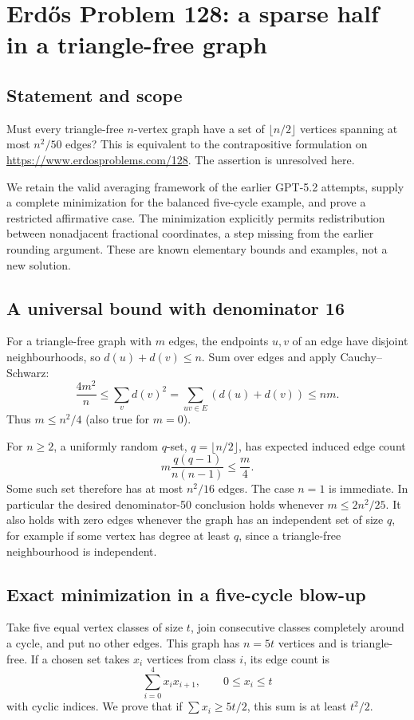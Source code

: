 \section*{Erd\H{o}s Problem 128: a sparse half in a triangle-free graph}
\subsection*{Statement and scope}
Must every triangle-free $n$-vertex graph have a set of $\lfloor n/2\rfloor$ vertices spanning at most $n^2/50$ edges? This is equivalent to the contrapositive formulation on \url{https://www.erdosproblems.com/128}. The assertion is unresolved here.

We retain the valid averaging framework of the earlier GPT-5.2 attempts, supply a complete minimization for the balanced five-cycle example, and prove a restricted affirmative case. The minimization explicitly permits redistribution between nonadjacent fractional coordinates, a step missing from the earlier rounding argument. These are known elementary bounds and examples, not a new solution.

\subsection*{A universal bound with denominator 16}
For a triangle-free graph with $m$ edges, the endpoints $u,v$ of an edge have disjoint neighbourhoods, so $d(u)+d(v)\le n$. Sum over edges and apply Cauchy--Schwarz:
\[
 \frac{4m^2}{n}\le\sum_v d(v)^2
 =\sum_{uv\in E}(d(u)+d(v))\le nm.
\]
Thus $m\le n^2/4$ (also true for $m=0$).

For $n\ge2$, a uniformly random $q$-set, $q=\lfloor n/2\rfloor$, has expected induced edge count
\[
 m\frac{q(q-1)}{n(n-1)}\le\frac m4.
\]
Some such set therefore has at most $n^2/16$ edges. The case $n=1$ is immediate. In particular the desired denominator-50 conclusion holds whenever $m\le2n^2/25$. It also holds with zero edges whenever the graph has an independent set of size $q$, for example if some vertex has degree at least $q$, since a triangle-free neighbourhood is independent.

\subsection*{Exact minimization in a five-cycle blow-up}
Take five equal vertex classes of size $t$, join consecutive classes completely around a cycle, and put no other edges. This graph has $n=5t$ vertices and is triangle-free. If a chosen set takes $x_i$ vertices from class $i$, its edge count is
\[
 \sum_{i=0}^4x_ix_{i+1},\qquad 0\le x_i\le t
\]
with cyclic indices. We prove that if $\sum x_i\ge5t/2$, this sum is at least $t^2/2$.

